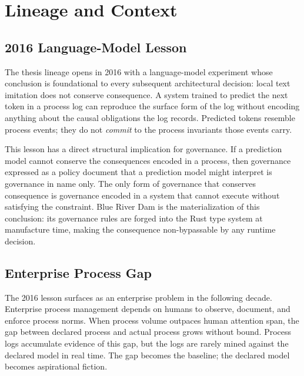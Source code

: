 
\section{Lineage and Context}
\label{sec:blue-river-dam-lineage}

\subsection{2016 Language-Model Lesson}
\label{sec:blue-river-dam-lineage-2016}

The thesis lineage opens in 2016 with a language-model experiment whose
conclusion is foundational to every subsequent architectural decision: local
text imitation does not conserve consequence. A system trained to predict the
next token in a process log can reproduce the surface form of the log without
encoding anything about the causal obligations the log records. Predicted tokens
resemble process events; they do not \emph{commit} to the process invariants
those events carry.

This lesson has a direct structural implication for governance. If a prediction
model cannot conserve the consequences encoded in a process, then governance
expressed as a policy document that a prediction model might interpret is
governance in name only. The only form of governance that conserves consequence
is governance encoded in a system that cannot execute without satisfying the
constraint. Blue River Dam is the materialization of this conclusion: its
governance rules are forged into the Rust type system at manufacture time,
making the consequence non-bypassable by any runtime decision.

\subsection{Enterprise Process Gap}
\label{sec:blue-river-dam-lineage-gap}

The 2016 lesson surfaces as an enterprise problem in the following decade.
Enterprise process management depends on humans to observe, document, and
enforce process norms. When process volume outpaces human attention span, the
gap between declared process and actual process grows without bound. Process
logs accumulate evidence of this gap, but the logs are rarely mined against the
declared model in real time. The gap becomes the baseline; the declared model
becomes aspirational fiction.

